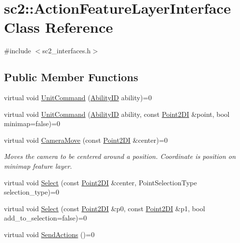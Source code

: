 \hypertarget{classsc2_1_1_action_feature_layer_interface}{}\section{sc2\+:\+:Action\+Feature\+Layer\+Interface Class Reference}
\label{classsc2_1_1_action_feature_layer_interface}


{\ttfamily \#include $<$sc2\+\_\+interfaces.\+h$>$}

\subsection*{Public Member Functions}
\begin{DoxyCompactItemize}
\item 
virtual void \hyperlink{classsc2_1_1_action_feature_layer_interface_a425ea9449bdde698047f2b32eae44f62}{Unit\+Command} (\hyperlink{classsc2_1_1_s_c2_type}{Ability\+ID} ability)=0
\item 
virtual void \hyperlink{classsc2_1_1_action_feature_layer_interface_a8d58e436d717242917645d27e772999f}{Unit\+Command} (\hyperlink{classsc2_1_1_s_c2_type}{Ability\+ID} ability, const \hyperlink{structsc2_1_1_point2_d_i}{Point2\+DI} \&point, bool minimap=false)=0
\item 
\mbox{\label{classsc2_1_1_action_feature_layer_interface_a6d41928e74a3988ff218047e6ce7f1d9}} 
virtual void \hyperlink{classsc2_1_1_action_feature_layer_interface_a6d41928e74a3988ff218047e6ce7f1d9}{Camera\+Move} (const \hyperlink{structsc2_1_1_point2_d_i}{Point2\+DI} \&center)=0
\begin{DoxyCompactList}\small\item\em Moves the camera to be centered around a position. Coordinate is position on minimap feature layer. \end{DoxyCompactList}\item 
virtual void \hyperlink{classsc2_1_1_action_feature_layer_interface_ae61f19efc78b6114d91ca64f1fb72108}{Select} (const \hyperlink{structsc2_1_1_point2_d_i}{Point2\+DI} \&center, Point\+Selection\+Type selection\+\_\+type)=0
\item 
virtual void \hyperlink{classsc2_1_1_action_feature_layer_interface_a084b4cd006586c0a9637b1067a437a42}{Select} (const \hyperlink{structsc2_1_1_point2_d_i}{Point2\+DI} \&p0, const \hyperlink{structsc2_1_1_point2_d_i}{Point2\+DI} \&p1, bool add\+\_\+to\+\_\+selection=false)=0
\item 
virtual void \hyperlink{classsc2_1_1_action_feature_layer_interface_ab9f434ec52e62fac77dcb99f9cc81080}{Send\+Actions} ()=0
\end{DoxyCompactItemize}


